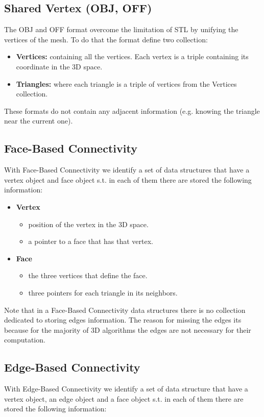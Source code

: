 \subsection{Shared Vertex (OBJ, OFF)}
The OBJ and OFF format overcome the limitation of STL by unifying the vertices of the mesh. To do that the format define two collection: 
\begin{itemize}
    \item \textbf{Vertices:} containing all the vertices. Each vertex is a triple containing its coordinate in the 3D space.
    \item \textbf{Triangles:} where each triangle is a triple of vertices from the Vertices collection.
\end{itemize}
These formats do not contain any adjacent information (e.g. knowing the triangle near the current one).

\subsection{Face-Based Connectivity}
With Face-Based Connectivity we identify a set of data structures that have a vertex object and face object s.t. in each of them there are stored the following information:

\begin{itemize}
    \item \textbf{Vertex}
        \begin{itemize}
            \item position of the vertex in the 3D space.
            \item a pointer to a face that has that vertex.
        \end{itemize}
    \item \textbf{Face}
        \begin{itemize}
            \item the three vertices that define the face.
            \item three pointers for each triangle in its neighbors.
        \end{itemize}
\end{itemize}

Note that in a Face-Based Connectivity data structures there is no collection dedicated to storing edges information. The reason for missing the edges its because for the majority of 3D algorithms the edges are not necessary for their computation.

\subsection{Edge-Based Connectivity}
With Edge-Based Connectivity we identify a set of data structure that have a vertex object, an edge object and a face object s.t. in each of them there are stored the following information:

